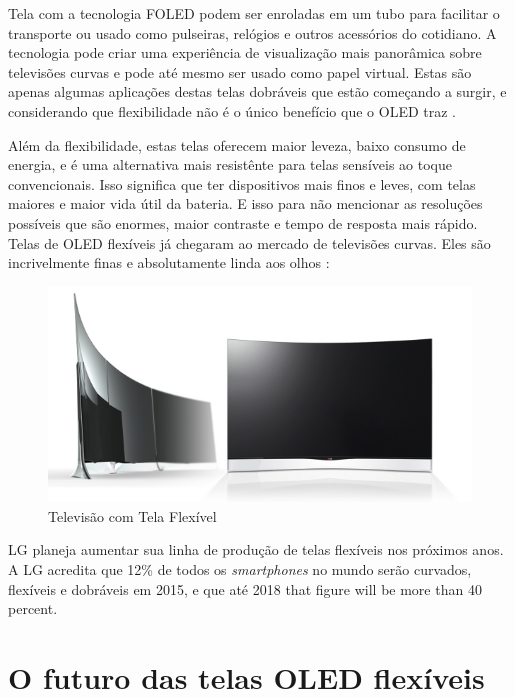 Tela com a tecnologia FOLED podem ser enroladas em um tubo para facilitar o transporte ou usado como pulseiras, relógios e outros acessórios do cotidiano. A tecnologia pode criar uma experiência de visualização mais panorâmica sobre televisões curvas e pode até mesmo ser usado como papel virtual. Estas são apenas algumas aplicações destas telas dobráveis ​​que estão começando a surgir, e considerando que flexibilidade não é o único benefício que o OLED traz \cite{FSIJS}.

Além da flexibilidade, estas telas oferecem maior leveza, baixo consumo de energia, e é uma alternativa mais resistênte para telas sensíveis ao toque convencionais. Isso significa que ter dispositivos mais finos e leves, com telas maiores e maior vida útil da bateria. E isso para não mencionar as resoluções possíveis que são enormes, maior contraste e tempo de resposta mais rápido. Telas de OLED flexíveis já chegaram ao mercado de televisões curvas. Eles são incrivelmente finas e absolutamente linda aos olhos \cite{FSIJS}:

\begin{figure}[!h]
  \centering
  \includegraphics[width=.60\textwidth]{./figuras/flexible-tv} 
  \caption{Televisão com Tela Flexível}
  \label{fig:flexible-tv} 
\end{figure}

LG planeja aumentar sua linha de produção de telas flexíveis nos próximos anos. A LG acredita que 12\% de todos os \textit{smartphones} no mundo serão curvados, flexíveis e dobráveis em 2015, e que até 2018 that figure will be more than 40 percent.








\section{O futuro das telas OLED flexíveis}
\label{sec:investimento}